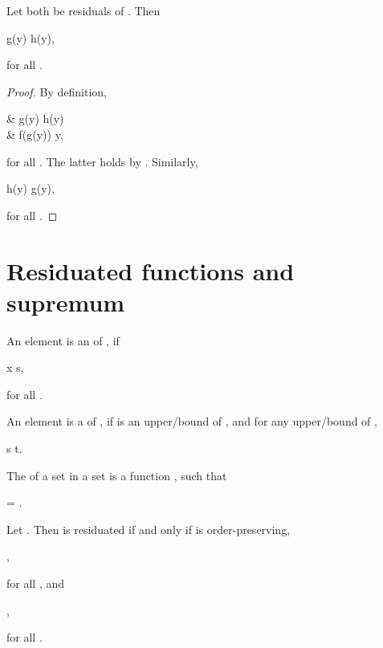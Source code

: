 \documentclass[b5paper, english, oneside]{memoir}
\begin{document}
\begin{theorem}
\label{ResidualIsEssentiallyUnique}
Let  both be residuals of . Then
\begin{eqs}
g(y) \preeq h(y),
\end{eqs}
for all .
\end{theorem}

\begin{proof}
By definition,
\begin{eqs}
{} & g(y) \preleq h(y) \\
\iffr & f(g(y)) \preleqb y,
\end{eqs}
for all . The latter holds by . Similarly,
\begin{eqs}
h(y) \preleq g(y),
\end{eqs}
for all . 
\end{proof}

\section{Residuated functions and supremum}

\begin{definition}
An element  is an  of , if
\begin{eqs}
x \preleq s,
\end{eqs}
for all .
\end{definition}

\begin{definition}
An element  is a  of , if  is an upper\-/bound of , and for any upper\-/bound  of ,
\begin{eqs}
s \preleq t.
\end{eqs}
\end{definition}

\begin{definition}[Supremum]
The  of a set in a set  is a function , such that
\begin{eqs}
 = .
\end{eqs}
\end{definition}

\begin{theorem}
\label{ResiduatedPropertyBySupremum}
Let . Then  is residuated if and only if  is order-preserving,
\begin{eqs}
 \neq \emptyset,
\end{eqs}
for all , and
\begin{eqs}
 \subset {},
\end{eqs}
for all .
\end{theorem}
\end{document}
